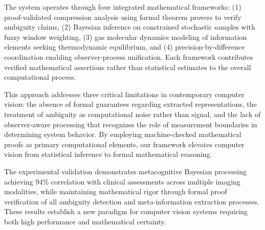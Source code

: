 \documentclass[11pt,a4paper]{article}
\begin{document}
The system operates through four integrated mathematical frameworks: (1) proof-validated compression analysis using formal theorem provers to verify ambiguity claims, (2) Bayesian inference on constrained stochastic samples with fuzzy window weighting, (3) gas molecular dynamics modeling of information elements seeking thermodynamic equilibrium, and (4) precision-by-difference coordination enabling observer-process unification. Each framework contributes verified mathematical assertions rather than statistical estimates to the overall computational process.

This approach addresses three critical limitations in contemporary computer vision: the absence of formal guarantees regarding extracted representations, the treatment of ambiguity as computational noise rather than signal, and the lack of observer-aware processing that recognizes the role of measurement boundaries in determining system behavior. By employing machine-checked mathematical proofs as primary computational elements, our framework elevates computer vision from statistical inference to formal mathematical reasoning.

The experimental validation demonstrates metacognitive Bayesian processing achieving 94\% correlation with clinical assessments across multiple imaging modalities, while maintaining mathematical rigor through formal proof verification of all ambiguity detection and meta-information extraction processes. These results establish a new paradigm for computer vision systems requiring both high performance and mathematical certainty.
\end{document}
